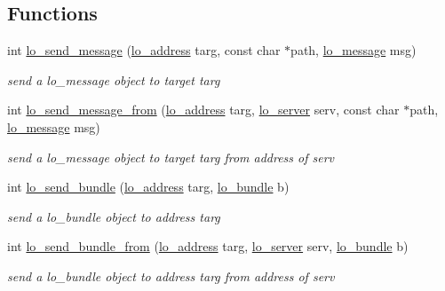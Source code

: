 \subsection*{Functions}
\begin{CompactItemize}
\item 
int \hyperlink{group__liblolowlevel_g175a13c6d81adf5c346cdca9bbdcf225}{lo\_\-send\_\-message} (\hyperlink{lo__types_8h_bf9b53223467de596b89e1377b0f3f3d}{lo\_\-address} targ, const char $\ast$path, \hyperlink{lo__types_8h_d126083c98d941f00eb72d1690b38d63}{lo\_\-message} msg)
\begin{CompactList}\small\item\em send a lo\_\-message object to target targ \item\end{CompactList}\item 
int \hyperlink{group__liblolowlevel_g9d1aa7c1ee1ce60fe0cf7e3f1e5a6822}{lo\_\-send\_\-message\_\-from} (\hyperlink{lo__types_8h_bf9b53223467de596b89e1377b0f3f3d}{lo\_\-address} targ, \hyperlink{lo__types_8h_59067bf50cf8abb4371da6f03c9036c9}{lo\_\-server} serv, const char $\ast$path, \hyperlink{lo__types_8h_d126083c98d941f00eb72d1690b38d63}{lo\_\-message} msg)
\begin{CompactList}\small\item\em send a lo\_\-message object to target targ from address of serv \item\end{CompactList}\item 
int \hyperlink{group__liblolowlevel_gd1138d0f777693ae0321e3da65aee53e}{lo\_\-send\_\-bundle} (\hyperlink{lo__types_8h_bf9b53223467de596b89e1377b0f3f3d}{lo\_\-address} targ, \hyperlink{lo__types_8h_96254950ad34e9cfbf8a6613fc74025b}{lo\_\-bundle} b)
\begin{CompactList}\small\item\em send a lo\_\-bundle object to address targ \item\end{CompactList}\item 
int \hyperlink{group__liblolowlevel_gb5de220b7d6d7c2bf6b0ca4316a54b7a}{lo\_\-send\_\-bundle\_\-from} (\hyperlink{lo__types_8h_bf9b53223467de596b89e1377b0f3f3d}{lo\_\-address} targ, \hyperlink{lo__types_8h_59067bf50cf8abb4371da6f03c9036c9}{lo\_\-server} serv, \hyperlink{lo__types_8h_96254950ad34e9cfbf8a6613fc74025b}{lo\_\-bundle} b)
\begin{CompactList}\small\item\em send a lo\_\-bundle object to address targ from address of serv \item\end{CompactList}\item 

\end{CompactItemize}
